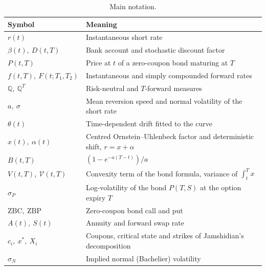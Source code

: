 \documentclass[11pt,a4paper]{article}
\theoremstyle{plain}
\theoremstyle{definition}
\newcommand{\Q}{\mathbb{Q}}
\begin{document}
\begin{table}[htbp]
\centering
\small
\begin{tabular}{@{}ll@{}}
\toprule
Symbol & Meaning \\
\midrule
$r(t)$ & Instantaneous short rate \\
$\beta(t),\ D(t,T)$ & Bank account and stochastic discount factor \\
$P(t,T)$ & Price at $t$ of a zero-coupon bond maturing at $T$ \\
$f(t,T),\ F(t;T_1,T_2)$ & Instantaneous and simply compounded forward rates \\
$\Q,\ \Q^T$ & Risk-neutral and $T$-forward measures \\
$a,\ \sigma$ & Mean reversion speed and normal volatility of the short rate \\
$\theta(t)$ & Time-dependent drift fitted to the curve \\
$x(t),\ \alpha(t)$ & Centred Ornstein--Uhlenbeck factor and deterministic shift, $r=x+\alpha$ \\
$B(t,T)$ & $(1-e^{-a(T-t)})/a$ \\
$V(t,T),\ \mathcal{V}(t,T)$ & Convexity term of the bond formula, variance of $\int_t^Tx$ \\
$\sigma_P$ & Log-volatility of the bond $P(T,S)$ at the option expiry $T$ \\
$\mathrm{ZBC},\ \mathrm{ZBP}$ & Zero-coupon bond call and put \\
$A(t),\ S(t)$ & Annuity and forward swap rate \\
$c_i,\ x^*,\ X_i$ & Coupons, critical state and strikes of Jamshidian's decomposition \\
$\sigma_N$ & Implied normal (Bachelier) volatility \\
\bottomrule
\end{tabular}
\caption{Main notation.}
\label{tab:notation}
\end{table}

\clearpage
\end{document}
